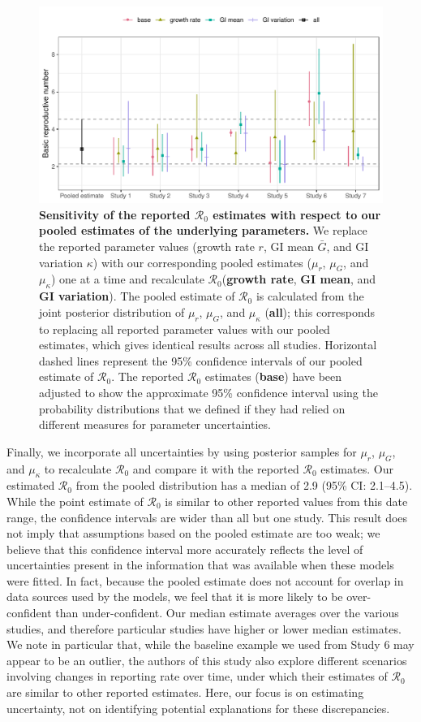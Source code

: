 \documentclass[12pt]{article}
\newcommand{\Ro}{\ensuremath{{\mathcal R}_{0}}\xspace}
\begin{document}
\begin{figure}[!th]
\includegraphics[width=\textwidth]{compare_R0.pdf}
\caption{
\textbf{Sensitivity of the reported \Ro estimates with respect to our pooled estimates of the underlying parameters.}
We replace the reported parameter values (growth rate $r$, GI mean $\bar G$, and GI variation $\kappa$) with our corresponding pooled estimates ($\mu_r$, $\mu_G$, and $\mu_\kappa$) one at a time and recalculate \Ro (\textbf{growth rate}, \textbf{GI mean}, and \textbf{GI variation}).
The pooled estimate of \Ro is calculated from the joint posterior distribution of $\mu_r$, $\mu_G$, and $\mu_\kappa$ (\textbf{all});
this corresponds to replacing all reported parameter values with our pooled estimates, which gives identical results across all studies.
Horizontal dashed lines represent the 95\% confidence intervals of our pooled estimate of \Ro.
The reported \Ro estimates (\textbf{base}) have been adjusted to show the approximate 95\% confidence interval using the probability distributions that we defined if they had relied on different measures for parameter uncertainties.
}
\label{fig:R0}
\end{figure}

Finally, we incorporate all uncertainties by using posterior samples for $\mu_r$, $\mu_G$, and $\mu_\kappa$ to recalculate \Ro and compare it with the reported \Ro estimates.
Our estimated \Ro from the pooled distribution has a median of 2.9 (95\% CI: 2.1--4.5).
While the point estimate of \Ro is similar to other reported values from this date range, the confidence intervals are wider than all but one study.
This result does not imply that assumptions based on the pooled estimate are too weak;
we believe that this confidence interval more accurately reflects the level of uncertainties present in the information that was available when these models were fitted.
In fact, because the pooled estimate does not account for overlap in data sources used by the models, we feel that it is more likely to be over-confident than under-confident.
Our median estimate averages over the various studies, and therefore particular studies have higher or lower median estimates.
We note in particular that, while the baseline example we used from Study 6 may appear to be an outlier, the authors of this study also explore different scenarios involving changes in reporting rate over time, under which their estimates of \Ro are similar to other reported estimates.
Here, our focus is on estimating uncertainty, not on identifying potential explanations for these discrepancies.
\end{document}
